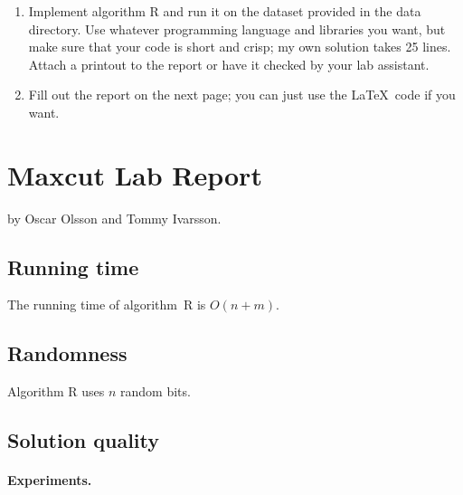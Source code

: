 \documentclass{tufte-handout}
\begin{document}
\begin{enumerate}
\item Implement algorithm R and run it on the dataset provided in
  the data directory.
  Use whatever programming language and libraries you want, but make
  sure that your code is short and crisp; my own solution takes 25
  lines.
  Attach a printout to the report or have it checked by your lab
  assistant.
\item Fill out the report on the next page; you can just use the
  \LaTeX\ code if you want.
\end{enumerate}

\newpage


\newpage
\section{Maxcut Lab Report}


by Oscar Olsson and Tommy Ivarsson.

\subsection{Running time}

The running time of algorithm~R is $O(n + m)$.

\subsection{Randomness}

Algorithm R uses $n$ random bits.

\subsection{Solution quality}

\paragraph{Experiments.}
\end{document}
